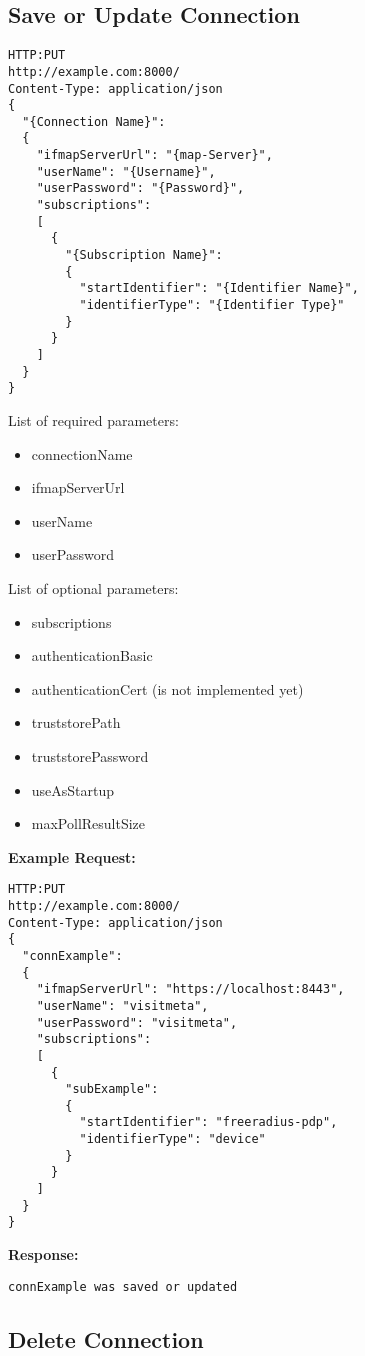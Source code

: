 \subsection{Save or Update Connection}
\begin{lstlisting}
HTTP:PUT
http://example.com:8000/
Content-Type: application/json
{
  "{Connection Name}":
  {
    "ifmapServerUrl": "{map-Server}",
    "userName": "{Username}",
    "userPassword": "{Password}",
    "subscriptions":
    [
      {
        "{Subscription Name}":
        {
          "startIdentifier": "{Identifier Name}",
          "identifierType": "{Identifier Type}"
        }
      }
    ]
  }
}
\end{lstlisting}
List of required parameters:
\begin{itemize}
\item connectionName
\item ifmapServerUrl
\item userName
\item userPassword
\end{itemize}
List of optional parameters:
\begin{itemize}
\item subscriptions
\item authenticationBasic
\item authenticationCert (is not implemented yet)
\item truststorePath
\item truststorePassword
\item useAsStartup
\item maxPollResultSize
\end{itemize}

\textbf{Example Request:}
\begin{lstlisting}
HTTP:PUT
http://example.com:8000/
Content-Type: application/json
{
  "connExample":
  {
    "ifmapServerUrl": "https://localhost:8443",
    "userName": "visitmeta",
    "userPassword": "visitmeta",
    "subscriptions":
    [
      {
        "subExample":
        {
          "startIdentifier": "freeradius-pdp",
          "identifierType": "device"
        }
      }
    ]
  }
}
\end{lstlisting}

\textbf{Response:}
\begin{lstlisting}
connExample was saved or updated
\end{lstlisting}

\subsection{Delete Connection}

